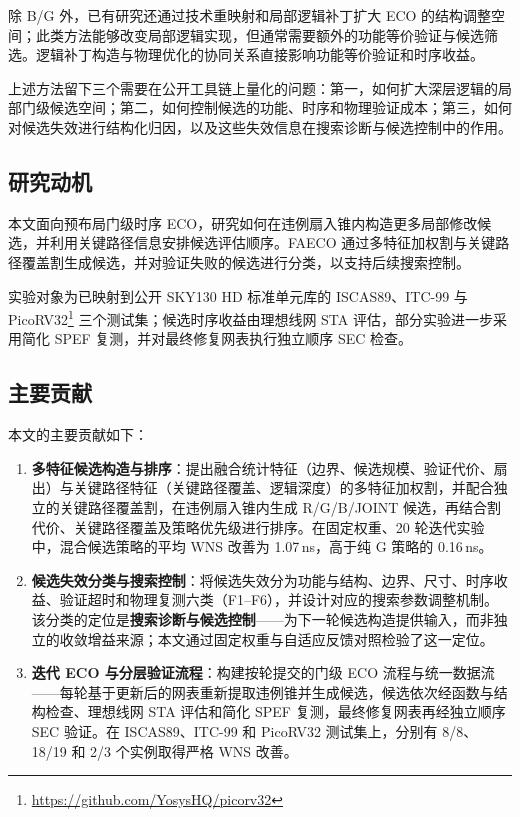 \documentclass[twocolumn,10pt,fontset=windows]{ctexart}
\begin{document}
除 B/G 外，已有研究还通过技术重映射和局部逻辑补丁扩大 ECO 的结构调整空间；此类方法能够改变局部逻辑实现，但通常需要额外的功能等价验证与候选筛选。逻辑补丁构造与物理优化的协同关系直接影响功能等价验证和时序收益。

上述方法留下三个需要在公开工具链上量化的问题：第一，如何扩大深层逻辑的局部门级候选空间；第二，如何控制候选的功能、时序和物理验证成本；第三，如何对候选失效进行结构化归因，以及这些失效信息在搜索诊断与候选控制中的作用。
\subsection{研究动机}
本文面向预布局门级时序 ECO，研究如何在违例扇入锥内构造更多局部修改候选，并利用关键路径信息安排候选评估顺序。FAECO 通过多特征加权割与关键路径覆盖割生成候选，并对验证失败的候选进行分类，以支持后续搜索控制。

实验对象为已映射到公开 SKY130 HD 标准单元库的 ISCAS89\cite{iscas89}、ITC-99\cite{itc99} 与 PicoRV32\footnote{\url{https://github.com/YosysHQ/picorv32}} 三个测试集；候选时序收益由理想线网 STA 评估，部分实验进一步采用简化 SPEF 复测，并对最终修复网表执行独立顺序 SEC 检查。

\subsection{主要贡献}
本文的主要贡献如下：

\begin{enumerate}
  \item \textbf{多特征候选构造与排序}：提出融合统计特征（边界、候选规模、验证代价、扇出）与关键路径特征（关键路径覆盖、逻辑深度）的多特征加权割，并配合独立的关键路径覆盖割，在违例扇入锥内生成 R/G/B/JOINT 候选，再结合割代价、关键路径覆盖及策略优先级进行排序。在固定权重、20 轮迭代实验中，混合候选策略的平均 WNS 改善为 1.07\,ns，高于纯 G 策略的 0.16\,ns。
  \item \textbf{候选失效分类与搜索控制}：将候选失效分为功能与结构、边界、尺寸、时序收益、验证超时和物理复测六类（F1--F6），并设计对应的搜索参数调整机制。该分类的定位是\textbf{搜索诊断与候选控制}——为下一轮候选构造提供输入，而非独立的收敛增益来源；本文通过固定权重与自适应反馈对照检验了这一定位。
  \item \textbf{迭代 ECO 与分层验证流程}：构建按轮提交的门级 ECO 流程与统一数据流——每轮基于更新后的网表重新提取违例锥并生成候选，候选依次经函数与结构检查、理想线网 STA 评估和简化 SPEF 复测，最终修复网表再经独立顺序 SEC 验证。在 ISCAS89、ITC-99 和 PicoRV32 测试集上，分别有 8/8、18/19 和 2/3 个实例取得严格 WNS 改善。
\end{enumerate}
\end{document}

